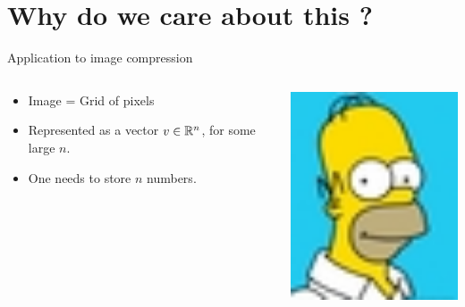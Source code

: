 \documentclass{beamer}
\begin{document}
\section{Why do we care about this ?}
\begin{frame}{Application to image compression}
	\vspace{-0.6cm}
	\begin{columns}
		\begin{column}{0.5\textwidth}
			\begin{itemize}
				\item Image = Grid of pixels
				\item Represented as a vector $v \in \mathbb{R}^n$, for some large $n$.
				\item One needs to store $n$ numbers.
			\end{itemize}
		\end{column}
		\begin{column}{0.5\textwidth}
			\begin{center}
				\begin{image}
					\includegraphics[width=5.5cm]{./homer1.jpg}
					\caption{$n=44 \times 55 = 2420$}
				\end{image}
			\end{center}
		\end{column}
	\end{columns}
\end{frame}
\end{document}
